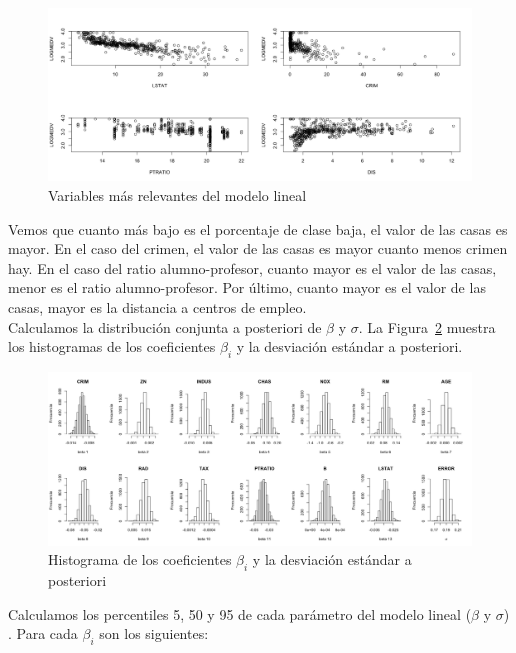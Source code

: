 \documentclass[12pt,a4paper,twoside,openright,titlepage,final]{article}
\begin{document}
\begin{figure}[tbph!]\centering
\includegraphics[width=0.9\linewidth]{imagenes/variables_relevantes}
\caption{Variables más relevantes del modelo lineal}
\label{fig:variables_relevantes}
\end{figure}

Vemos que cuanto más bajo es el porcentaje de clase baja, el valor de las casas es mayor. En el caso del crimen, el valor de las casas es mayor cuanto menos crimen hay. En el caso del ratio alumno-profesor, cuanto mayor es el valor de las casas, menor es el ratio alumno-profesor. Por último, cuanto mayor es el valor de las casas, mayor es la distancia a centros de empleo.\\

Calculamos la distribución conjunta a posteriori de $\beta$ y $\sigma$. La Figura~\ref{fig:histograma_beta} muestra los histogramas de los coeficientes $\beta_i$ y la desviación estándar a posteriori.

\begin{figure}[tbph!]
\centering
\includegraphics[width=0.9\linewidth]{imagenes/histograma_beta}
\caption{Histograma de los coeficientes $\beta_i$ y la desviación estándar a posteriori}
\label{fig:histograma_beta}
\end{figure}

Calculamos los percentiles 5, 50 y 95 de cada parámetro del modelo lineal ($\beta$ y $\sigma$) . Para cada $\beta_i$ son los siguientes:
\end{document}
